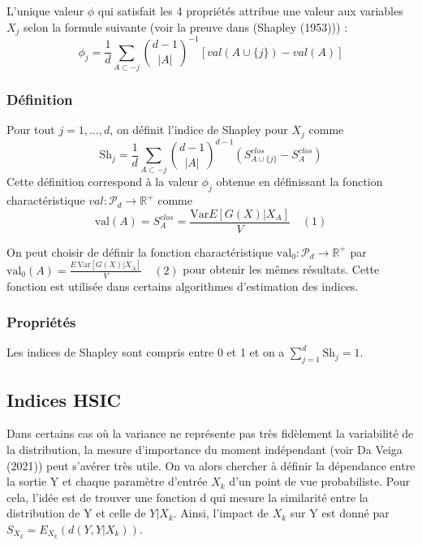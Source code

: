 \documentclass[
]{article}
\begin{document}
L'unique valeur \(\phi\) qui satisfait les 4 propriétés attribue une
valeur aux variables \(X_{j}\) selon la formule suivante (voir la preuve
dans (Shapley (1953))) : \[
\phi_j = \frac{1}{d} \sum_{A \subset -j} \binom{d-1}{|A|}^{-1} [val(A \cup \{j\}) - val(A)]
\]

\hypertarget{duxe9finition}{%
\subsubsection{Définition}\label{duxe9finition}}

Pour tout \(j = 1, \ldots, d\), on définit l'indice de Shapley pour
\(X_j\) comme
\[ \text{Sh}_j = \frac{1}{d} \sum_{A \subset -j} \binom{d-1}{|A|}^{d-1} \left( S^{clos}_{A \cup \{j\}} - S^{clos}_A \right) \]
Cette définition correspond à la valeur \(\phi_j\) obtenue en
définissant la fonction charactéristique
\(val : \mathcal{P}_d \rightarrow \mathbb{R}^+\) comme
\[ \text{val}(A) = S^{clos}_A = \frac{\text{Var} E[G(X) | X_A]}{V} \quad (1) \]

On peut choisir de définir la fonction charactéristique
\(\text{val}_0 : \mathcal{P}_d \rightarrow \mathbb{R}^+\) par
\(\text{val}_0(A) = \frac{E \, \text{Var}[G(X) | X_{\overline{A}}]}{V} \quad (2)\)
pour obtenir les mêmes résultats. Cette fonction est utilisée dans
certains algorithmes d'estimation des indices.

\hypertarget{propriuxe9tuxe9s}{%
\subsubsection{Propriétés}\label{propriuxe9tuxe9s}}

Les indices de Shapley sont compris entre 0 et 1 et on a
\(\sum_{j=1}^{d} \text{Sh}_j=1\).

\hypertarget{indices-hsic}{%
\subsection{Indices HSIC}\label{indices-hsic}}

Dans certains cas où la variance ne représente pas très fidèlement la
variabilité de la distribution, la mesure d'importance du moment
indépendant (voir Da Veiga (2021)) peut s'avérer très utile. On va alors
chercher à définir la dépendance entre la sortie Y et chaque paramètre
d'entrée \(X_k\) d'un point de vue probabiliste. Pour cela, l'idée est
de trouver une fonction d qui mesure la similarité entre la distribution
de Y et celle de \(Y|X_k\). Ainsi, l'impact de \(X_k\) sur Y est donné
par \(S_{X_k}=E_{X_k}(d(Y,Y|X_k))\).
\end{document}

